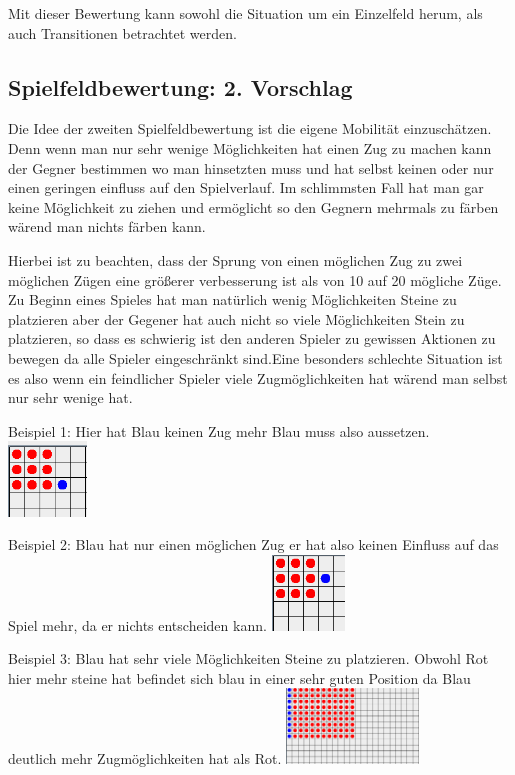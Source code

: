 \documentclass[12pt,a4paper,bibliography=totocnumbered,listof=totocnumbered]{scrartcl}
\begin{document}
    Mit dieser Bewertung kann sowohl die Situation um ein Einzelfeld herum, als auch Transitionen betrachtet werden.

    \subsection{Spielfeldbewertung: 2. Vorschlag}
    Die Idee der zweiten Spielfeldbewertung ist die eigene Mobilität einzuschätzen. Denn wenn man nur sehr wenige Möglichkeiten hat einen Zug zu machen kann der Gegner bestimmen wo man hinsetzten muss und hat selbst keinen oder nur einen geringen einfluss auf den Spielverlauf. Im schlimmsten Fall hat man gar keine Möglichkeit zu ziehen und ermöglicht so den Gegnern mehrmals zu färben wärend man nichts färben kann.

    Hierbei ist zu beachten, dass der Sprung von einen möglichen Zug zu zwei möglichen Zügen eine größerer verbesserung ist als von 10 auf 20 mögliche Züge.
    Zu Beginn eines Spieles hat man natürlich wenig Möglichkeiten Steine zu platzieren aber der Gegener hat auch nicht so viele Möglichkeiten Stein zu platzieren, so dass es schwierig ist den anderen Spieler zu gewissen Aktionen zu bewegen da alle Spieler eingeschränkt sind.Eine besonders schlechte Situation ist es also wenn ein feindlicher Spieler viele Zugmöglichkeiten hat wärend man selbst nur sehr wenige hat.

    Beispiel 1: Hier hat Blau keinen Zug mehr Blau muss also aussetzen.
    \newline
    \includegraphics[height=2cm]{pics/BlauKeinZug}

    Beispiel 2: Blau hat nur einen möglichen Zug er hat also keinen Einfluss auf das Spiel mehr, da er nichts entscheiden kann.
    \newline
    \includegraphics[height=2cm]{pics/BlauEinZug}

    Beispiel 3: Blau hat sehr viele Möglichkeiten Steine zu platzieren. Obwohl Rot hier mehr steine hat befindet sich blau in einer sehr guten Position da Blau deutlich mehr Zugmöglichkeiten hat als Rot.
    \newline
    \includegraphics[height=2cm]{pics/BlauVieleZuege}
\end{document}
